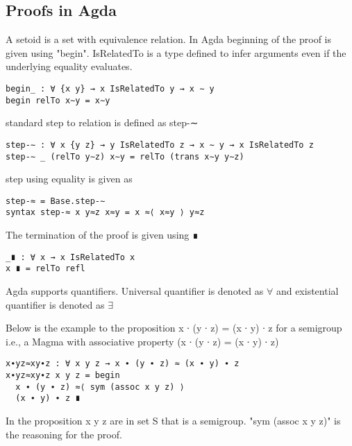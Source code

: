 \subsection{Proofs in Agda}
A setoid is a set with equivalence relation. In Agda beginning of the proof is given using "begin". IsRelatedTo is a type defined to infer arguments even if the underlying equality evaluates. 
\begin{Verbatim}
begin_ : ∀ {x y} → x IsRelatedTo y → x ∼ y
begin relTo x∼y = x∼y
\end{Verbatim}
standard step to relation is defined as step-∼
\begin{Verbatim}
step-∼ : ∀ x {y z} → y IsRelatedTo z → x ∼ y → x IsRelatedTo z
step-∼ _ (relTo y∼z) x∼y = relTo (trans x∼y y∼z)
\end{Verbatim}
step using equality is given as
\begin{Verbatim}
step-≈ = Base.step-∼
syntax step-≈ x y≈z x≈y = x ≈⟨ x≈y ⟩ y≈z
\end{Verbatim}
The termination of the proof is given using \textunderscore ∎
\begin{Verbatim}
_∎ : ∀ x → x IsRelatedTo x
x ∎ = relTo refl
\end{Verbatim}
Agda supports quantifiers. Universal quantifier is denoted as \(\forall\) and existential quantifier is denoted as \(\exists\) 

Below is the example to the proposition x ∙ (y ∙ z) = (x ∙ y) ∙ z  for a semigroup i.e., a Magma with associative property (x ∙ (y ∙ z) = (x ∙ y) ∙ z) 
\begin{Verbatim}
x∙yz≈xy∙z : ∀ x y z → x ∙ (y ∙ z) ≈ (x ∙ y) ∙ z
x∙yz≈xy∙z x y z = begin 
  x ∙ (y ∙ z) ≈⟨ sym (assoc x y z) ⟩ 
  (x ∙ y) ∙ z ∎
\end{Verbatim}
In the proposition x y z are in set S that is a semigroup. "sym (assoc x y z)" is the reasoning for the proof.

